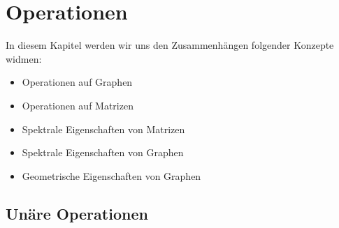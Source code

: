 \chapter{Operationen} \label{chap:operations}

    In diesem Kapitel werden wir uns den Zusammenhängen folgender Konzepte widmen:

    \begin{itemize}
        \item Operationen auf Graphen
        \item Operationen auf Matrizen
        \item Spektrale Eigenschaften von Matrizen
        \item Spektrale Eigenschaften von Graphen
        \item Geometrische Eigenschaften von Graphen
    \end{itemize}

    \section{Unäre Operationen}

